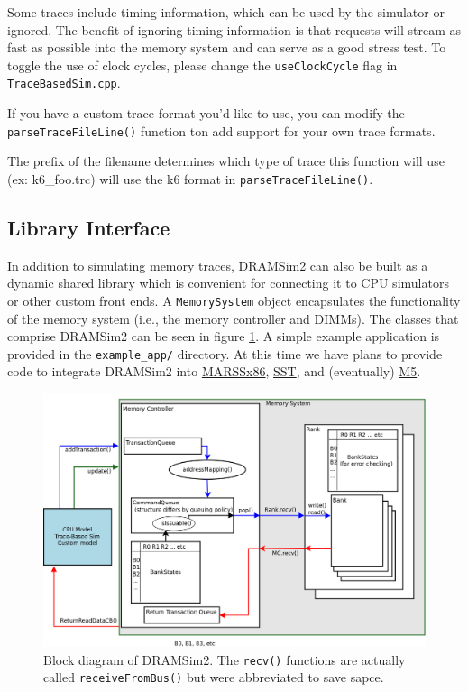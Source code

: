 \documentclass[11pt]{article}
\begin{document}
\begin{minipage}{\textwidth}
\begin{lstlisting}
\end{lstlisting}

	Some traces include timing information, which can be used
	by the simulator or ignored. The benefit of ignoring timing information is that requests
	will stream as fast as possible into the memory system and can serve as a good stress
	test. To toggle the use of clock cycles, please change the \texttt{useClockCycle} flag in \texttt{TraceBasedSim.cpp}.

	If you have a custom trace format you'd like to use, you can modify the \texttt{parseTraceFileLine()} function ton add
	support for your own trace formats. 

	The prefix of the filename determines which type of trace this function will use (ex: k6\_foo.trc) will use the k6 format 
	in \texttt{parseTraceFileLine()}.
\end{minipage}

\subsection{Library Interface}\label{library}
In addition to simulating memory traces, DRAMSim2 can also be built as a dynamic
shared library which is convenient for connecting it to CPU simulators or other
custom front ends.  A \texttt{MemorySystem} object encapsulates the
functionality of the memory system (i.e., the memory controller and DIMMs). The 
classes that comprise DRAMSim2 can be seen in figure \ref{classes}. A
simple example application is provided in the \texttt{example\_app/} directory.
At this time we have plans to provide code to integrate DRAMSim2 into 
\href{http://www.marss86.org/index.php/Home}{MARSSx86},
\href{http://www.cs.sandia.gov/sst/}{SST}, and (eventually)
\href{http://www.m5sim.org/}{M5}.

\begin{figure}[h]
\begin{center}
\includegraphics[width=\linewidth]{docs/classes.png}
\caption{Block diagram of DRAMSim2. The \texttt{\footnotesize recv()} functions are actually called
\texttt{\footnotesize receiveFromBus()} but were abbreviated to save sapce.}
\label{classes}
\end{center}
\end{figure}
\end{document}
